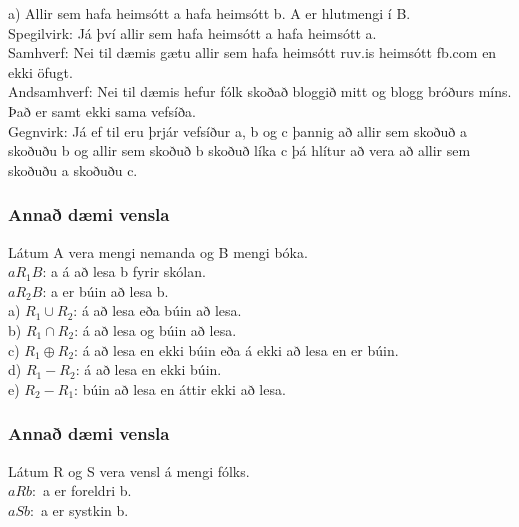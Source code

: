 a) Allir sem hafa heimsótt a hafa heimsótt b. A er hlutmengi í B.\\
\hspace*{2.2em} Spegilvirk: Já því allir sem hafa heimsótt a hafa heimsótt a.\\
\hspace*{2.2em} Samhverf: Nei til dæmis gætu allir sem hafa heimsótt ruv.is heimsótt fb.com \hspace*{2.2em} en ekki öfugt.\\
\hspace*{2.2em} Andsamhverf: Nei til dæmis hefur fólk skoðað bloggið mitt og blogg bróðurs \hspace*{2.2em} míns. Það er samt ekki sama vefsíða.\\ 
\hspace*{2.2em} Gegnvirk: Já ef til eru þrjár vefsíður a, b og c þannig að allir sem skoðuð \hspace*{2.2em} a skoðuðu b og allir sem skoðuð b skoðuð líka c þá hlítur að vera að allir sem \hspace*{2.2em} skoðuðu a skoðuðu c.\\

\newpage
\subsubsection{Annað dæmi vensla}
Látum A vera mengi nemanda og B mengi bóka.\\
$aR_1B$: a á að lesa b fyrir skólan.\\
$aR_2B$: a er búin að lesa b.\\

a) $R_1 \cup R_2$: á að lesa eða búin að lesa.\\

b) $R_1 \cap R_2$: á að lesa og búin að lesa.\\

c) $R_1 \oplus R_2$: á að lesa en ekki búin eða á ekki að lesa en er búin.\\

d) $R_1 - R_2$: á að lesa en ekki búin.\\

e) $R_2 - R_1$: búin að lesa en áttir ekki að lesa.

\subsubsection{Annað dæmi vensla}
Látum R og S vera vensl á mengi fólks.\\
$aRb:$ a er foreldri b.\\
$aSb:$ a er systkin b.\\


